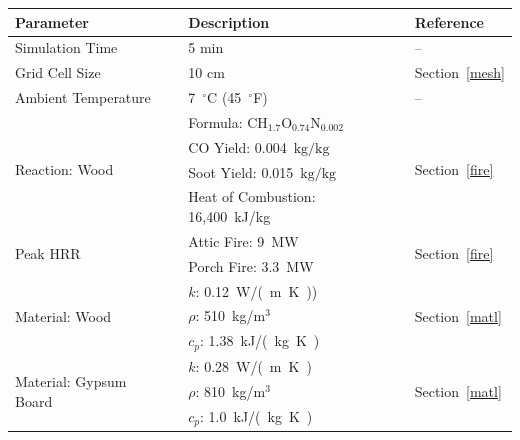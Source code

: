 \documentclass[12pt,oneside]{book}
\renewcommand{\C}{\mbox{C}}
\renewcommand{\H}{\mbox{H}}
\renewcommand{\O}{\mbox{O}}
\newcommand{\N}{\mbox{N}}
\begin{document}
\begin{table}
\centering
{}\label{tab:mod_param}
\begin{tabular}{lll}
\toprule[1.5pt]
Parameter & Description & Reference  \\
\midrule
 Simulation Time                   &  5 min                                                        & -- \\[.25cm]
 Grid Cell Size                    &  10 cm                                                        & Section~\ref{mesh} \\ [.25cm]
 Ambient Temperature~\cite{NIOSH:Bowyer}              &  7~$^{\circ}$C (45~$^{\circ}$F)                                               & -- \\ [.1cm]
\multirow{4}{*}{Reaction: Wood~\cite{SFPE:Tewarson}}    &  Formula: $\C\H_{1.7}\O_{0.74}\N_{0.002}$                     & \multirow{4}{*}{Section~\ref{fire}} \\
                                   &  CO Yield: 0.004~$\mathrm{kg}/\mathrm{kg}$   & \\
                                   &  Soot Yield: 0.015~$\mathrm{kg}/\mathrm{kg}$  & \\
                                   &  Heat of Combustion: 16,400~kJ/kg                             & \\ [.25cm]
\multirow{2}{*}{Peak HRR}          &  Attic Fire: 9~MW                                             & \multirow{2}{*}{Section~\ref{fire}}\\ 
                                   &  Porch Fire: 3.3~MW                                           & \\ [.25cm]                     
\multirow{3}{*}{Material: Wood~\cite{Incropera:1} }   &  $k$: 0.12~\si{W/(m.K)})                                   & \multirow{3}{*}{Section~\ref{matl}} \\
                                   &  $\rho$: 510~kg/m$^3$                                      & \\
                                   &  $c_{p}$: 1.38~\si{kJ/(kg.K)}                              & \\[.25cm]
\multirow{3}{*}{Material: Gypsum Board~\cite{WAKILI2007}}  &  $k$: 0.28~\si{W/(m.K)}                                    &  \multirow{3}{*}{Section~\ref{matl}}\\ 
                                   &  $\rho$: 810~kg/m$^3$                                      & \\ 
                                   &  $c_{p}$: 1.0~\si{kJ/(kg.K)}                               & \\
\bottomrule[1.25pt]
\end{tabular}\par
\end{table}
\end{document}
